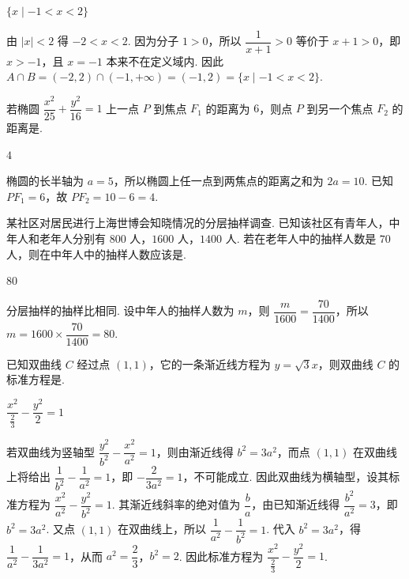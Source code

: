 \begin{answer}
\(\{x\mid -1<x<2\}\)
\end{answer}

\begin{solution}
由 \(|x|<2\) 得 \(-2<x<2\). 因为分子 \(1>0\)，所以 \(\dfrac{1}{x+1}>0\) 等价于 \(x+1>0\)，即 \(x>-1\)，且 \(x=-1\) 本来不在定义域内. 因此 \(A\cap B=(-2,2)\cap(-1,+\infty)=(-1,2)=\{x\mid -1<x<2\}\).
\end{solution}

\begin{problem}
若椭圆 \(\dfrac{x^2}{25}+\dfrac{y^2}{16}=1\) 上一点 \(P\) 到焦点 \(F_1\) 的距离为 \(6\)，则点 \(P\) 到另一个焦点 \(F_2\) 的距离是\fillinblank{}.
\end{problem}

\begin{answer}
\(4\)
\end{answer}

\begin{solution}
椭圆的长半轴为 \(a=5\)，所以椭圆上任一点到两焦点的距离之和为 \(2a=10\). 已知 \(PF_1=6\)，故 \(PF_2=10-6=4\).
\end{solution}

\begin{problem}
某社区对居民进行上海世博会知晓情况的分层抽样调查. 已知该社区有青年人，中年人和老年人分别有 \(800\text{ 人}\)，\(1600\text{ 人}\)，\(1400\text{ 人}\). 若在老年人中的抽样人数是 \(70\) 人，则在中年人中的抽样人数应该是\fillinblank{}.
\end{problem}

\begin{answer}
\(80\)
\end{answer}

\begin{solution}
分层抽样的抽样比相同. 设中年人的抽样人数为 \(m\)，则 \(\dfrac{m}{1600}=\dfrac{70}{1400}\)，所以 \(m=1600\times\dfrac{70}{1400}=80\).
\end{solution}

\begin{problem}
已知双曲线 \(C\) 经过点 \((1,1)\)，它的一条渐近线方程为 \(y=\sqrt{3}x\)，则双曲线 \(C\) 的标准方程是\fillinblank{}.
\end{problem}

\begin{answer}
\(\dfrac{x^2}{\frac{2}{3}}-\dfrac{y^2}{2}=1\)
\end{answer}

\begin{solution}
若双曲线为竖轴型 \(\dfrac{y^2}{b^2}-\dfrac{x^2}{a^2}=1\)，则由渐近线得 \(b^2=3a^2\)，而点 \((1,1)\) 在双曲线上将给出 \(\dfrac{1}{b^2}-\dfrac{1}{a^2}=1\)，即 \(-\dfrac{2}{3a^2}=1\)，不可能成立. 因此双曲线为横轴型，设其标准方程为 \(\dfrac{x^2}{a^2}-\dfrac{y^2}{b^2}=1\). 其渐近线斜率的绝对值为 \(\dfrac{b}{a}\)，由已知渐近线得 \(\dfrac{b^2}{a^2}=3\)，即 \(b^2=3a^2\). 又点 \((1,1)\) 在双曲线上，所以 \(\dfrac{1}{a^2}-\dfrac{1}{b^2}=1\). 代入 \(b^2=3a^2\)，得 \(\dfrac{1}{a^2}-\dfrac{1}{3a^2}=1\)，从而 \(a^2=\dfrac{2}{3}\)，\(b^2=2\). 因此标准方程为 \(\dfrac{x^2}{\frac{2}{3}}-\dfrac{y^2}{2}=1\).
\end{solution}


